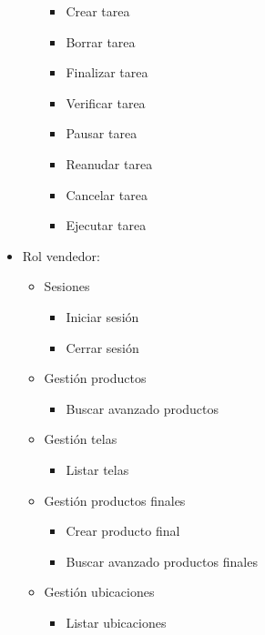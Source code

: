 \begin{itemize}
\begin{itemize}
            \begin{itemize}
                \item Crear tarea
                \item Borrar tarea
                \item Finalizar tarea
                \item Verificar tarea
                \item Pausar tarea
                \item Reanudar tarea
                \item Cancelar tarea
                \item Ejecutar tarea
            \end{itemize}
        \end{itemize}
        
        \item Rol vendedor:
        \begin{itemize}
            \item Sesiones
            \begin{itemize}
                \item Iniciar sesión
                \item Cerrar sesión
            \end{itemize}
            \item Gestión productos
            \begin{itemize}
                \item Buscar avanzado productos
            \end{itemize}
            \item Gestión telas
            \begin{itemize}
                \item Listar telas
            \end{itemize}
            \item Gestión productos finales
            \begin{itemize}
                \item Crear producto final
                \item Buscar avanzado productos finales
            \end{itemize}
            \item Gestión ubicaciones
            \begin{itemize}
                \item Listar ubicaciones
            \end{itemize}

\end{itemize}
\end{itemize}
